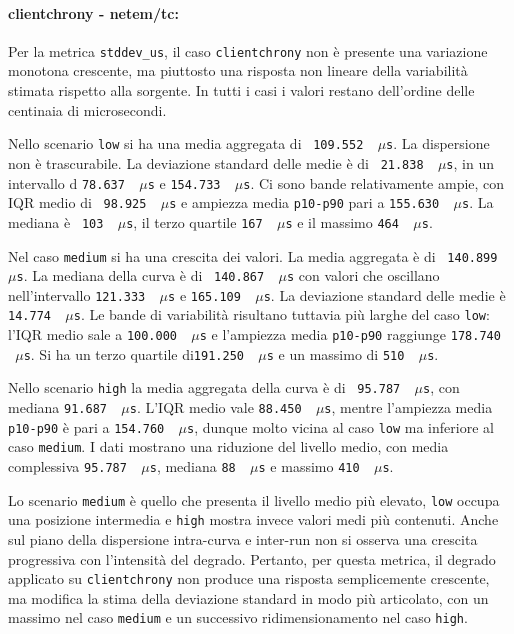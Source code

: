 \paragraph*{clientchrony - netem/tc:}
Per la metrica \texttt{stddev\_us}, il caso \texttt{clientchrony} non è presente una variazione
monotona crescente, ma piuttosto una risposta non lineare della variabilità
stimata rispetto alla sorgente. In tutti i casi i valori restano dell'ordine delle
centinaia di microsecondi.

Nello scenario \texttt{low} si ha una media aggregata di ~\texttt{109.552 \,$\mu$s}.
La dispersione non è trascurabile. La deviazione standard delle medie è di ~\texttt{21.838
\,$\mu$s}, in un intervallo d \texttt{78.637 \,$\mu$s} e \texttt{154.733 \,$\mu$s}.
Ci sono bande relativamente ampie, con IQR medio di ~\texttt{98.925 \,$\mu$s} e
ampiezza media \texttt{p10-p90} pari a \texttt{155.630 \,$\mu$s}. La mediana è ~\texttt{103
\,$\mu$s}, il terzo quartile \texttt{167 \,$\mu$s} e il massimo \texttt{464 \,$\mu$s}.

Nel caso \texttt{medium} si ha una crescita dei valori. La media aggregata è di
~\texttt{140.899 \,$\mu$s}. La mediana della curva è di ~\texttt{140.867 \,$\mu$s}
con valori che oscillano nell'intervallo \texttt{121.333 \,$\mu$s} e \texttt{165.109
\,$\mu$s}. La deviazione standard delle medie è \texttt{14.774 \,$\mu$s}. Le
bande di variabilità risultano tuttavia più larghe del caso \texttt{low}: l'IQR
medio sale a \texttt{100.000 \,$\mu$s} e l'ampiezza media \texttt{p10-p90}
raggiunge \texttt{178.740 \,$\mu$s}. Si ha un terzo quartile di\texttt{191.250
\,$\mu$s} e un massimo di \texttt{510 \,$\mu$s}.

Nello scenario \texttt{high} la media aggregata della curva è di ~\texttt{95.787
\,$\mu$s}, con mediana \texttt{91.687 \,$\mu$s}. L'IQR medio vale \texttt{88.450
\,$\mu$s}, mentre l'ampiezza media \texttt{p10-p90} è pari a \texttt{154.760 \,$\mu$s},
dunque molto vicina al caso \texttt{low} ma inferiore al caso \texttt{medium}. I dati
mostrano una riduzione del livello medio, con media complessiva \texttt{95.787
\,$\mu$s}, mediana \texttt{88 \,$\mu$s} e massimo \texttt{410 \,$\mu$s}.

Lo scenario \texttt{medium} è quello che presenta il livello medio più elevato,
\texttt{low} occupa una posizione intermedia e \texttt{high} mostra invece valori
medi più contenuti. Anche sul piano della dispersione intra-curva e inter-run non
si osserva una crescita progressiva con l'intensità del degrado. Pertanto, per questa
metrica, il degrado applicato su \texttt{clientchrony} non produce una risposta semplicemente
crescente, ma modifica la stima della deviazione standard in modo più articolato,
con un massimo nel caso \texttt{medium} e un successivo ridimensionamento nel
caso \texttt{high}.

